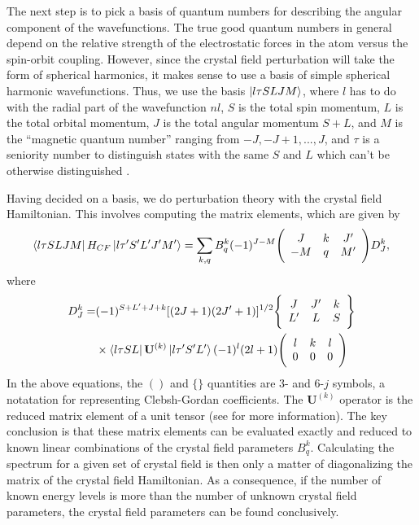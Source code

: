 \documentclass[12pt]{puthesis}
\begin{document}
The next step is to pick a basis of quantum numbers for describing the angular component of the wavefunctions. The true good quantum numbers in general depend on the relative strength of the electrostatic forces in the atom versus the spin-orbit coupling. However, since the crystal field perturbation will take the form of spherical harmonics, it makes sense to use a basis of simple spherical harmonic wavefunctions. Thus, we use the basis $\ket{l\tau SLJM}$, where $l$ has to do with the radial part of the wavefunction $nl$, $S$ is the total spin momentum, $L$ is the total orbital momentum, $J$ is the total angular momentum $S+L$, and $M$ is the ``magnetic quantum number'' ranging from $-J,-J+1,...,J$, and $\tau$ is a seniority number to distinguish states with the same $S$ and $L$ which can't be otherwise distinguished \cite{Liu2006}.

Having decided on a basis, we do perturbation theory with the crystal field Hamiltonian. This involves computing the matrix elements, which are given by
\begin{equation}\label{eq:4}
  \bra{l\tau SLJM} H_{CF} \ket{l\tau' S'L'J'M'} = \sum_{k, q} B_{q}^{k}(-1)^{J-M}\Bigg(\begin{array}{c c c}J & k & J' \\ -M & q & M'\end{array}\Bigg)D_{J}^{k},
\end{equation}
where
\begin{align}
  D_{J}^{k} =
  & (-1)^{S+L'+J+k}[(2J+1)(2J'+1)]^{1/2}
    \Bigg\{\begin{array}{c c c} J & J' & k \\ L' & L & S \end{array}\Bigg\} \nonumber \\
  & \times \bra{l\tau S L } \mathbf{U}^{(k)}\ket{l\tau' S' L'}(-1)^{l}(2l + 1)
    \Bigg(\begin{array}{c c c} l & k & l \\ 0 & 0 & 0\end{array}\Bigg) \label{eq:5}                                                               
\end{align}
In the above equations, the $()$ and $\{\}$ quantities are 3- and 6-$j$ symbols, a notatation for representing Clebsh-Gordan coefficients. The $\mathbf{U}^{(k)}$ operator is the reduced matrix element of a unit tensor (see \cite{Wybourne1965} for more information). The key conclusion is that these matrix elements can be evaluated exactly and reduced to known linear combinations of the crystal field parameters $B_{q}^{k}$. Calculating the spectrum for a given set of crystal field is then only a matter of diagonalizing the matrix of the crystal field Hamiltonian. As a consequence, if the number of known energy levels is more than the number of unknown crystal field parameters, the crystal field parameters can be found conclusively.
\end{document}
